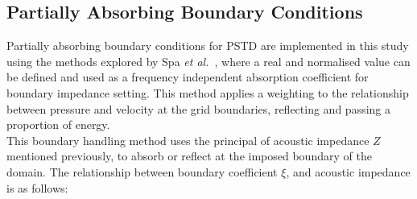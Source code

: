 \subsection{Partially Absorbing Boundary Conditions}
Partially absorbing boundary conditions for PSTD are implemented in this study using the methods explored by Spa \textit{et al.}~\cite{Spa2011}, where a real and normalised value can be defined and used as a frequency independent absorption coefficient for boundary impedance setting. This method applies a weighting to the relationship between pressure and velocity at the grid boundaries, reflecting and passing a proportion of energy.\\

This boundary handling method uses the principal of acoustic impedance $Z$ mentioned previously, to absorb or reflect at the imposed boundary of the domain. The relationship between boundary coefficient $\xi$, and acoustic impedance is as follows:


